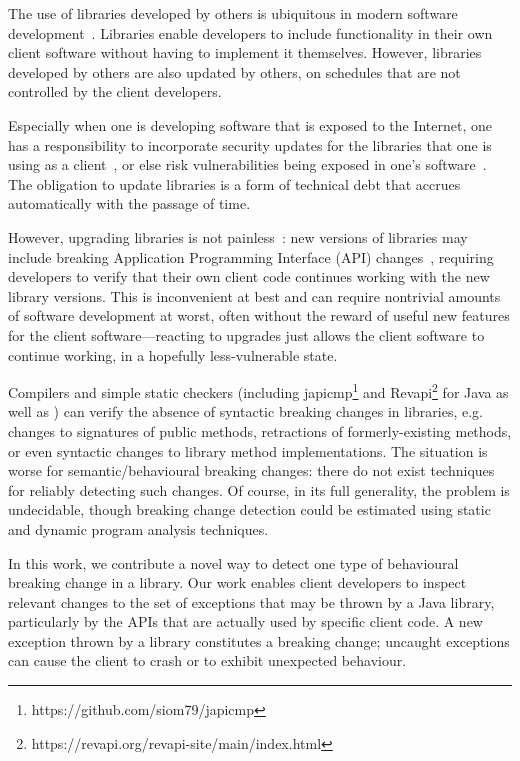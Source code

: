 The use of libraries developed by others is ubiquitous in modern
software development~\cite{huang22:_charac_java,wang20:_java}. Libraries enable developers to include
functionality in their own client software without having to
implement it themselves.  However, libraries developed by others are
also updated by others, on schedules that are not controlled by the client developers.

Especially when one is developing software that is exposed to the Internet, one
has a responsibility to incorporate security updates for the
libraries that one is using as a client~\cite{wu23:_under_threat_upstr_vulner_downs}, or else risk vulnerabilities
being exposed in one's software~\cite{haryono22:_autom_ident_librar_vulner_data,zhan21:_atvhun,alfadel23:_empir_python}. The obligation to update libraries is
a form of technical debt that accrues automatically with the passage
of time.

However, upgrading libraries is not painless~\cite{elizalde18:_towar_smoot_librar_migrat,derr17:_keep,dann23:_upcy}: new
versions of libraries may include breaking Application Programming
Interface (API) changes~\cite{dietrich14:_broken}, requiring developers to verify that their own client
code continues working with the new library versions. This is
inconvenient at best and can require nontrivial amounts of software development at worst,
often without the reward of useful new features for the client software---reacting to upgrades
just allows the client software to continue working, in a hopefully less-vulnerable
state.

Compilers and simple static
checkers (including japicmp\footnote{https://github.com/siom79/japicmp} and Revapi\footnote{https://revapi.org/revapi-site/main/index.html} for Java as well as \cite{brito18:_apidif,foo18:_effic_static_check_librar_updat})
can verify the absence of syntactic breaking changes in libraries,
e.g. changes to signatures of public methods, retractions of
formerly-existing methods, or even syntactic changes to library method
implementations. The situation is worse for semantic/behavioural breaking changes:
there do not exist techniques for reliably detecting such changes. Of
course, in its full generality, the problem is undecidable, though
breaking change detection could be estimated using static and dynamic program analysis
techniques.

In this work, we contribute a novel way to detect one type of behavioural breaking
change in a library. Our work enables client developers to inspect relevant changes
to the set of exceptions that may be thrown by a Java library, particularly
by the APIs that are actually used by specific client code. A new exception thrown by a library
constitutes a breaking change; uncaught exceptions can cause the client to crash or
to exhibit unexpected behaviour.

